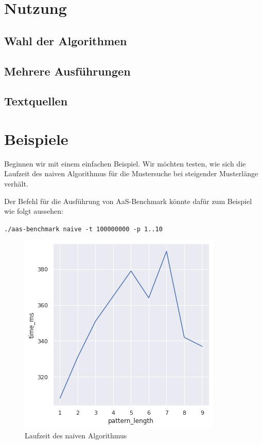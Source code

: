 \documentclass{article}
\begin{document}
\begin{multicols*}{2}
    \section{Nutzung}

    \subsection{Wahl der Algorithmen}

    \subsection{Mehrere Ausführungen}

    \subsection{Textquellen}

    \newpage

    \section{Beispiele}

    Beginnen wir mit einem einfachen Beispiel. Wir möchten testen, wie sich die Laufzeit des naiven Algorithmus für die Mustersuche bei steigender Musterlänge verhält.

    Der Befehl für die Ausführung von AaS-Benchmark könnte dafür zum Beispiel wie folgt aussehen:

    \texttt{./aas-benchmark naive -t 100000000 -p 1..10}

    \begin{figure}
        \includegraphics[width=\linewidth]{assets/graph_1.png}
        \caption{Laufzeit des naiven Algorithmus}
    \end{figure}


\end{multicols*}
\end{document}
